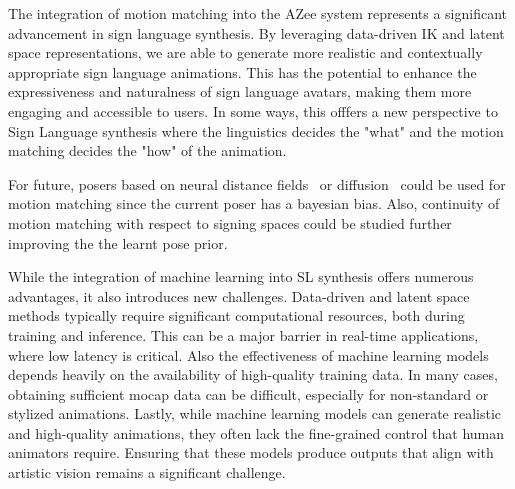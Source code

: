 \documentclass[../../main.tex]{subfiles}
\begin{document}
The integration of motion matching into the AZee system represents a significant advancement in sign language synthesis. By leveraging data-driven IK and latent space representations, we are able to generate more realistic and contextually appropriate sign language animations. This has the potential to enhance the expressiveness and naturalness of sign language avatars, making them more engaging and accessible to users. In some ways, this offfers a new perspective to Sign Language synthesis where the linguistics decides the "what" and the motion matching decides the "how" of the animation.

For future, posers based on neural distance fields~\cite{tiwari2022pose} or diffusion~\cite{lu2023dposer} could be used for motion matching since the current poser has a bayesian bias. Also, continuity of motion matching with respect to signing spaces could be studied further improving the the learnt pose prior.

While the integration of machine learning into SL synthesis offers numerous advantages, it also introduces new challenges. Data-driven and latent space methods typically require significant computational resources, both during training and inference. This can be a major barrier in real-time applications, where low latency is critical. Also the effectiveness of machine learning models depends heavily on the availability of high-quality training data. In many cases, obtaining sufficient mocap data can be difficult, especially for non-standard or stylized animations. Lastly, while machine learning models can generate realistic and high-quality animations, they often lack the fine-grained control that human animators require. Ensuring that these models produce outputs that align with artistic vision remains a significant challenge.
\end{document}
